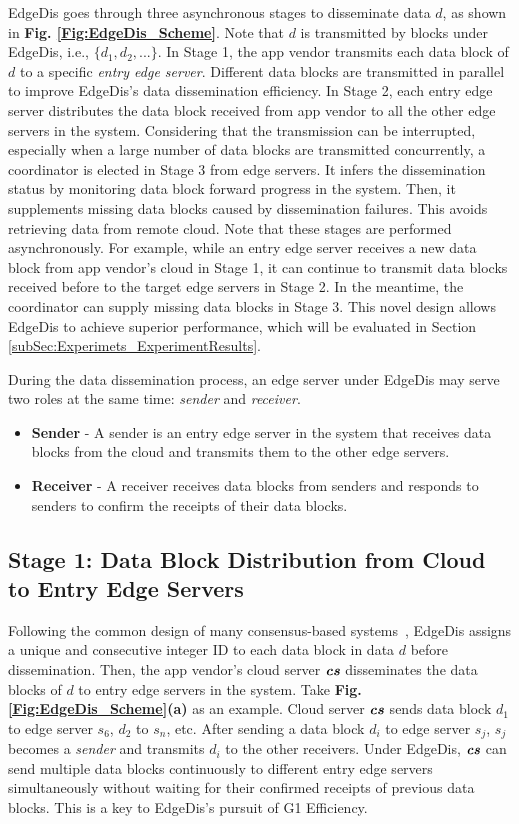 \documentclass[10pt,journal,compsoc]{IEEEtran}
\def\mathbi#1{\textbf{\em #1}}
\begin{document}
EdgeDis goes through three asynchronous stages to disseminate data $d$, as shown in \textbf{Fig. \ref{Fig:EdgeDis_Scheme}}. Note that $d$ is transmitted by blocks under EdgeDis, i.e., $\{d_1, d_2, ...\}$. In Stage 1, the app vendor transmits each data block of $d$ to a specific \textit{entry edge server}. Different data blocks are transmitted in parallel to improve EdgeDis's data dissemination efficiency. In Stage 2, each entry edge server distributes the data block received from app vendor to all the other edge servers in the system. Considering that the transmission can be interrupted, especially when a large number of data blocks are transmitted concurrently, a coordinator is elected in Stage 3 from edge servers. It infers the dissemination status by monitoring data block forward progress in the system. Then, it supplements missing data blocks caused by dissemination failures. This avoids retrieving data from remote cloud. Note that these stages are performed asynchronously. For example, while an entry edge server receives a new data block from app vendor's cloud in Stage 1, it can continue to transmit data blocks received before to the target edge servers in Stage 2. In the meantime, the coordinator can supply missing data blocks in Stage 3. This novel design allows EdgeDis to achieve superior performance, which will be evaluated in Section \ref{subSec:Experimets_ExperimentResults}.

During the data dissemination process, an edge server under EdgeDis may serve two roles at the same time: \textit{sender} and \textit{receiver}. 
\begin{itemize}
    \item \textbf{Sender} - A sender is an entry edge server in the system that receives data blocks from the cloud and transmits them to the other edge servers.
    \item \textbf{Receiver} - A receiver receives data blocks from senders and responds to senders to confirm the receipts of their data blocks.
\end{itemize}

%
\subsection{Stage 1: Data Block Distribution from Cloud to Entry Edge Servers}
\label{subSec:Reliable_AppVendorInteraction}


Following the common design of many consensus-based systems~\cite{zhou2019highly, sonbol2020edgekv}, EdgeDis assigns a unique and consecutive integer ID to each data block in data $d$ before dissemination. Then, the app vendor's cloud server $\mathbi{cs}$ disseminates the data blocks of $d$ to entry edge servers in the system. Take \textbf{Fig. \ref{Fig:EdgeDis_Scheme}(a)} as an example. Cloud server $\mathbi{cs}$ sends data block $d_1$ to edge server $s_6$, $d_2$ to $s_n$, etc. After sending a data block $d_i$ to edge server $s_j$, $s_j$ becomes a \textit{sender} and transmits $d_i$ to the other receivers. Under EdgeDis, $\mathbi{cs}$ can send multiple data blocks continuously to different entry edge servers simultaneously without waiting for their confirmed receipts of previous data blocks. This is a key to EdgeDis's pursuit of G1 Efficiency. 
\end{document}
